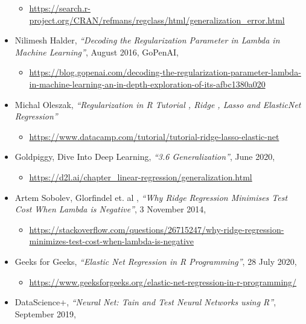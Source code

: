 \documentclass[
]{article}
\providecommand{\tightlist}{%
  \setlength{\itemsep}{0pt}\setlength{\parskip}{0pt}}
\begin{document}
\begin{itemize}
  \begin{itemize}
  \tightlist
  \item
    \url{https://search.r-project.org/CRAN/refmans/regclass/html/generalization_error.html}
  \end{itemize}
\item
  Nilimesh Halder, \emph{``Decoding the Regularization Parameter in
  Lambda in Machine Learning''}, August 2016, GoPenAI,

  \begin{itemize}
  \tightlist
  \item
    \url{https://blog.gopenai.com/decoding-the-regularization-parameter-lambda-in-machine-learning-an-in-depth-exploration-of-its-afbc1380a020}
  \end{itemize}
\item
  Michal Oleszak, \emph{``Regularization in R Tutorial , Ridge , Lasso
  and ElasticNet Regression'' }

  \begin{itemize}
  \tightlist
  \item
    \url{https://www.datacamp.com/tutorial/tutorial-ridge-lasso-elastic-net}
  \end{itemize}
\item
  Goldpiggy, Dive Into Deep Learning, \emph{``3.6 Generalization''},
  June 2020,

  \begin{itemize}
  \tightlist
  \item
    \url{https://d2l.ai/chapter_linear-regression/generalization.html}
  \end{itemize}
\item
  Artem Sobolev, Glorfindel et. al , \emph{``Why Ridge Regression
  Minimises Test Cost When Lambda is Negative''}, 3 November 2014,

  \begin{itemize}
  \tightlist
  \item
    \url{https://stackoverflow.com/questions/26715247/why-ridge-regression-minimizes-test-cost-when-lambda-is-negative}
  \end{itemize}
\item
  Geeks for Geeks, \emph{``Elastic Net Regression in R Programming''},
  28 July 2020,

  \begin{itemize}
  \tightlist
  \item
    \url{https://www.geeksforgeeks.org/elastic-net-regression-in-r-programming/}
  \end{itemize}
\item
  DataScience+, \emph{``Neural Net: Tain and Test Neural Networks using
  R''}, September 2019,


\end{itemize}
\end{document}
